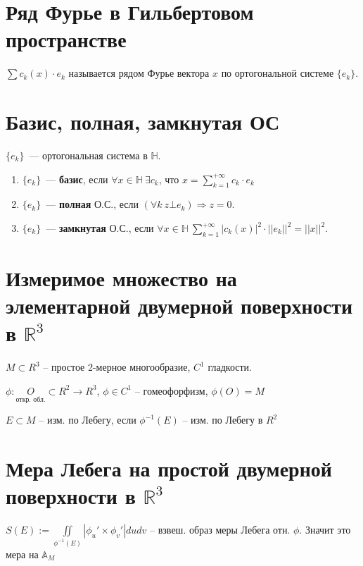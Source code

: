 \documentclass[paper=a4, fontsize=14pt]{report}
\begin{document}
	\section{Ряд Фурье в Гильбертовом пространстве}

	$\sum c_k(x) \cdot e_k$ называется рядом Фурье вектора $x$ по ортогональной системе $\{e_k\}$.

	\section{Базис, полная, замкнутая ОС}

	$\{e_k\}$~--- ортогональная система в $\mathds{H}$.

	\begin{enumerate}

		\item $\{e_k\}$~--- \textbf{базис}, если $\forall x \in \mathds{H}\ \exists c_k$, что $x = \sum\limits_{k=1}^{+\infty} c_k \cdot e_k$

		\item $\{e_k\}$~--- \textbf{полная} О.С., если $(\forall k ~ z \bot e_k) \Rightarrow z = 0$.

		\item $\{e_k\}$~--- \textbf{замкнутая} О.С., если $\forall x \in \mathds{H} ~ \sum\limits_{k=1}^{+\infty} |c_k(x)|^2 \cdot ||e_k||^2 = ||x||^2$.

	\end{enumerate}

	\section{Измеримое множество на элементарной двумерной поверхности в $\mathds{R}^3$}
	
	$ M \subset R^3 $ -- простое 2-мерное многообразие, $ C^1 $ гладкости.

	$ \phi : \underset{\text{откр. обл.}}{O} \subset R^2 \rightarrow R^3$, $ \phi \in C^1 $ -- гомеофорфизм, $ \phi(O) = M $

	$ E \subset M $ -- изм. по Лебегу, если $ \phi^{-1}(E) $ -- изм. по Лебегу в $ R^2 $
	
	\section{Мера Лебега на простой двумерной поверхности в $\mathds{R}^3$}

	$ S(E) := \iint\limits_{\phi^{-1}(E)} | \phi_u' \times \phi_v'| dudv $ -- взвеш. образ меры Лебега отн. $ \phi $. Значит это мера на $ \mathbb{A}_{M} $
\end{document}
